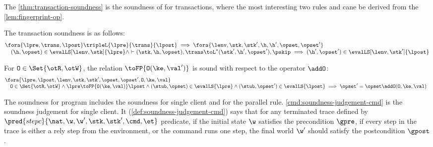 The \cref{thm:transaction-soundness} is the soundness of for transactions, where the most interesting two rules  and  cane be derived from the \cref{lem:fingerprint-op}.

\begin{theorem}
\label{thm:transaction-soundness}
The transaction soundness is as follows:
\[
    \begin{array}{@{}l@{}}
        \fora{ \lpre, \trans, \lpost } \tripleL{\lpre}{\trans}{\lpost}
        \implies 
        \fora{\lenv, \stk, \stk', \h, \h', \opset, \opset' }  \\
        \quad (\h, \opset) \in \evalLS[\lenv, \stk]{\lpre}
        \land \vdash (\stk, \h, \opset ), \trans \toL^{*}  (\stk', \h', \opset' ), \pskip 
        \implies (\h', \opset') \in \evalLS[\lenv, \stk']{\lpost}
    \end{array}
\]
\end{theorem}

\begin{lemma}
\label{lem:fingerprint-op}
For \( \mathtt{O} \in \Set{\otR, \otW} \), the relation \( \toFP{\mathtt{O}(\ke,\val')}\) is sound with respect to the operator \( \addO \):
\[
\begin{array}{@{}l}
    \fora{\lpre, \lpost, \lenv, \stk, \stk', \opset, \opset', \mathtt{O}, \ke, \val} \\
    \quad \mathtt{O} \in \Set{\otR, \otW} 
    \land \lpre \toFP{\mathtt{O}(\ke,\val)} \lpost
    \land (\stub, \opset) \in \evalLS{\lpre}
    \land (\stub, \opset') \in \evalLS{\lpost}
    \implies \opset' = \opset \addO (\mathtt{O}, \ke, \val)
\end{array}
\]
\end{lemma}

The soundness for program includes the soundness for single client and for the parallel rule.
\cref{cmd:soundness-judgement-cmd} is the soundness judgement for single client.
It (\cref{def:soundness-judgement-cmd}) says that for any terminated trace defined by \( \pred{stepc}{\nat, \w, \w', \stk, \stk', \cmd, \et} \) predicate, if the initial state \( \w \) satisfies the precondition \( \gpre \), if every step in the trace is either a rely step from the environment,
or the command runs one step, the final world \( \w' \) should satisfy the postcondition \( \gpost \).

